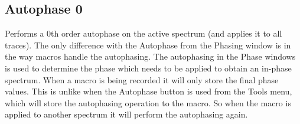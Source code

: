 \documentclass[11pt,a4paper]{article}
\begin{document}




\subsection{Autophase 0}
Performs a 0th order autophase on the active spectrum (and applies it to all traces). The only difference with the Autophase from the Phasing window is in the way macros handle the autophasing. 
The autophasing in the Phase windows is used to determine the phase which needs to be applied to obtain an in-phase spectrum. When a macro is being recorded it will only store the final phase values.
This is unlike when the Autophase button is used from the Tools menu, which will store the autophasing operation to the macro.
So when the macro is applied to another spectrum it will perform the autophasing again.
\end{document}
